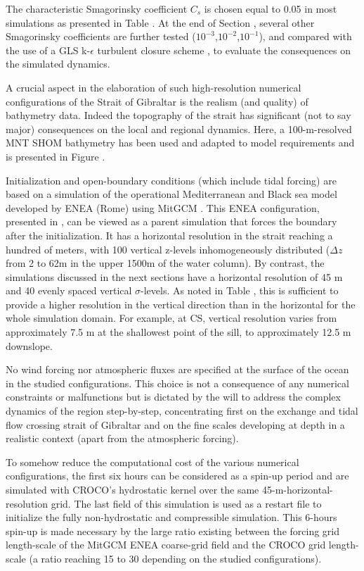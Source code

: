 The characteristic Smagorinsky coefficient $C_s$ is chosen equal to 0.05 in most simulations as presented in Table . At the end of Section , several other Smagorinsky coefficients are further tested  ($10^{-3}$,$10^{-2}$,$10^{-1}$), and compared with the use of a GLS k-$\epsilon$ turbulent closure scheme \citep{umlauf_2003}, to evaluate the consequences on the simulated dynamics.

A crucial aspect in the elaboration of such high-resolution numerical configurations of the Strait of Gibraltar is the realism (and quality) of bathymetry data. Indeed the topography of the strait has significant (not to say major) consequences on the local and regional dynamics. Here, a 100-m-resolved MNT SHOM bathymetry has been used and adapted to model requirements and is presented in Figure .

Initialization and open-boundary conditions (which include tidal forcing) are based on a simulation of the operational Mediterranean and Black sea model developed by ENEA (Rome) using MitGCM%
. This ENEA configuration, presented in \citet{palma_2020}, can be viewed as a parent simulation that forces the boundary after the initialization. It has a horizontal resolution in the strait reaching a hundred of meters, with 100 vertical z-levels inhomogeneously distributed ($\Delta z$ from 2 to 62m in the upper 1500m of the water column). By contrast, the simulations discussed in the next sections have a horizontal resolution of 45 m and 40 evenly spaced vertical $\sigma$-levels. As noted in Table , this is sufficient to provide a higher resolution in the vertical direction than in the horizontal for the whole simulation domain. For example, at CS, vertical resolution varies from approximately 7.5 m at the shallowest point of the sill, to approximately 12.5 m downslope.

No wind forcing nor atmospheric fluxes are specified at the surface of the ocean in the studied configurations. This choice is not a consequence of any numerical constraints or malfunctions but is dictated by the will to address the complex dynamics of the region step-by-step, concentrating first on the exchange and tidal flow crossing strait of Gibraltar and on the fine scales developing at depth in a realistic context (apart from the atmospheric forcing).

To somehow reduce the computational cost of the various numerical configurations, the first six hours can be considered as a spin-up period and are simulated with CROCO's hydrostatic kernel over the same 45-m-horizontal-resolution grid. The last field of this simulation is used as a restart file to initialize the fully non-hydrostatic and compressible simulation. This 6-hours spin-up is made necessary by the large ratio existing between the forcing grid length-scale of the MitGCM ENEA coarse-grid field and the CROCO grid length-scale (a ratio reaching 15 to 30 depending on the studied configurations). 

